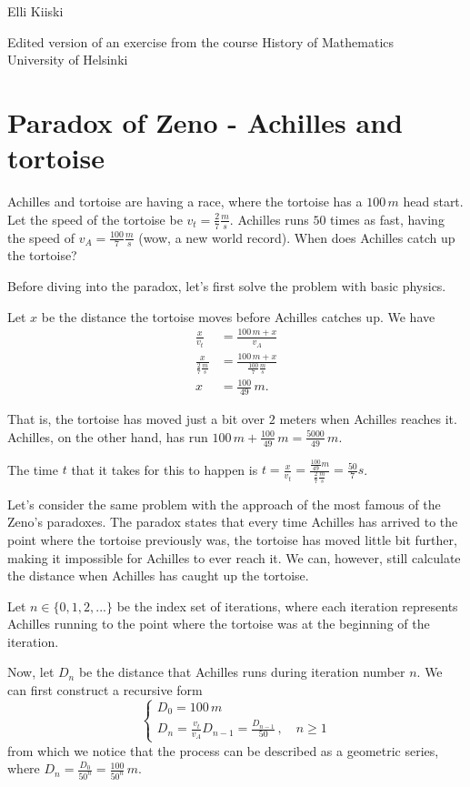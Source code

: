 \documentclass{article}
\begin{document}
{\large
Elli Kiiski
\par
Edited version of an exercise from the course History of Mathematics\\University of Helsinki
}
\vspace{0.5cm}

\section*{Paradox of Zeno - Achilles and tortoise}

Achilles and tortoise are having a race, where the tortoise has a $100\,m$ head start. Let the speed of the tortoise be $v_t=\frac{2}{7}\frac{m}{s}$. Achilles runs $50$ times as fast, having the speed of $v_A=\frac{100}{7}\frac{m}{s}$ (wow, a new world record). When does Achilles catch up the tortoise?

Before diving into the paradox, let's first solve the problem with basic physics.

Let $x$ be the distance the tortoise moves before Achilles catches up. We have
\begin{align*}
    \frac{x}{v_t} & = \frac{100\,m+x}{v_A}\\
    \frac{x}{\frac{2}{7}\frac{m}{s}} & = \frac{100\,m+x}{\frac{100}{7}\frac{m}{s}}\\
    x & = \frac{100}{49}\,m.
\end{align*}

That is, the tortoise has moved just a bit over $2$ meters when Achilles reaches it. Achilles, on the other hand, has run $100\,m + \frac{100}{49}\,m = \frac{5000}{49}\,m$.

The time $t$ that it takes for this to happen is $t = \frac{x}{v_t} = \frac{\frac{100}{49}m}{\frac{2}{7}\frac{m}{s}} = \frac{50}{7} s$.

Let's consider the same problem with the approach of the most famous of the Zeno's paradoxes. The paradox states that every time Achilles has arrived to the point where the tortoise previously was, the tortoise has moved little bit further, making it impossible for Achilles to ever reach it. We can, however, still calculate the distance when Achilles has caught up the tortoise.

Let $n \in \{0,1,2,...\}$ be the index set of iterations, where each iteration represents Achilles running to the point where the tortoise was at the beginning of the iteration. 

Now, let $D_n$ be the distance that Achilles runs during iteration number $n$. We can first construct a recursive form
\begin{equation*}
    \begin{cases}
    D_0 = 100\,m\\
    D_n = \frac{v_t}{v_A}D_{n-1} = \frac{D_{n-1}}{50}\,, \quad n\geq 1
    \end{cases}
\end{equation*}
from which we notice that the process can be described as a geometric series, where $D_n=\frac{D_0}{50^n}=\frac{100}{50^n}\,m$.
\end{document}
